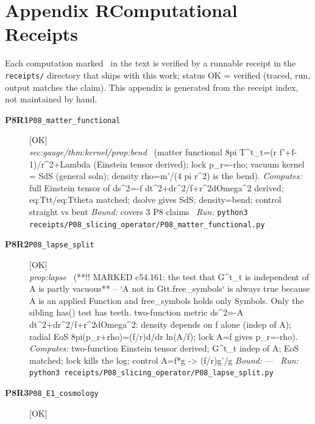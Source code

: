 \clearpage
\section*{Appendix R\quad Computational Receipts}\label{app:receipts}
\small\noindent Each computation marked \rcptmarker\ in the text is verified by a runnable receipt in the \texttt{receipts/} directory that ships with this work; status \textsf{OK} = verified (traced, run, output matches the claim). This appendix is generated from the receipt index, not maintained by hand.\par\medskip
\begingroup\renewcommand{\arraystretch}{1.25}
\begin{description}
\item[\textbf{P8R1}\quad\texttt{P08\_matter\_functional}]\hfill\textsf{[OK]}\\
\textit{sec:gauge/thm:kernel/prop:bend} \ (matter functional 8pi T\textasciicircum{}t\_t=(r f'+f-1)/r\textasciicircum{}2+Lambda (Einstein tensor derived); lock p\_r=-rho; vacuum kernel = SdS (general soln); density rho=m'/(4 pi r\textasciicircum{}2) is the bend). 
\emph{Computes:} full Einstein tensor of ds\textasciicircum{}2=-f dt\textasciicircum{}2+dr\textasciicircum{}2/f+r\textasciicircum{}2dOmega\textasciicircum{}2 derived; eq:Ttt/eq:Ttheta matched; dsolve gives SdS; density=bend; control straight vs bent
 \emph{Bound:} covers 3 P8 claims
\ \emph{Run:} \texttt{python3 receipts/P08\_slicing\_operator/P08\_matter\_functional.py}
\item[\textbf{P8R2}\quad\texttt{P08\_lapse\_split}]\hfill\textsf{[OK]}\\
\textit{prop:lapse} \ (**!! MARKED c54.161: the test that G\textasciicircum{}t\_t is independent of A is partly vacuous** -- `A not in Gtt.free\_symbols` is always true because A is an applied Function and free\_symbols holds only Symbols. Only the sibling has() test has teeth. two-function metric ds\textasciicircum{}2=-A dt\textasciicircum{}2+dr\textasciicircum{}2/f+r\textasciicircum{}2dOmega\textasciicircum{}2: density depends on f alone (indep of A); radial EoS 8pi(p\_r+rho)=(f/r)d/dr ln(A/f); lock A=f gives p\_r=-rho). 
\emph{Computes:} two-function Einstein tensor derived; G\textasciicircum{}t\_t indep of A; EoS matched; lock kills the log; control A=f*g -> (f/r)g'/g
 \emph{Bound:} ---
\ \emph{Run:} \texttt{python3 receipts/P08\_slicing\_operator/P08\_lapse\_split.py}
\item[\textbf{P8R3}\quad\texttt{P08\_E1\_cosmology}]\hfill\textsf{[OK]}\\

\end{description}
